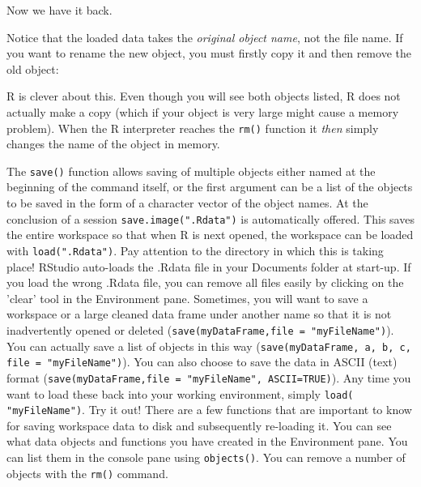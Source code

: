 \documentclass[titlepage]{book}\usepackage{knitr}
\begin{document}
\begin{knitrout}
\color{fgcolor}\begin{kframe}
\begin{alltt}
\hlstd{(}\hlstd{)}
\hlstd{()}
\end{alltt}
\end{kframe}
\end{knitrout}
Now we have it back.

Notice that the loaded data takes the \emph{original object name}, not the file name. If you want to rename the new object, you must firstly copy it and then remove the old object:

\begin{knitrout}
\color{fgcolor}\begin{kframe}
\begin{alltt}
 \hlkwb{<-} 
\hlstd{()}
\hlstd{()}
\end{alltt}
\end{kframe}
\end{knitrout}
R is clever about this.  Even though you will see both objects listed, R does not actually make a copy (which if your object is very large might cause a memory problem). When the R interpreter reaches the \texttt{rm()} function it \emph{then} simply changes the name of the object in memory.

The \texttt{save()} function allows saving of multiple objects either named at the beginning of the command itself, or the first argument can be a list of the objects to be saved in the form of a character vector of the object names.
 At the conclusion of a session \texttt{save.image(".Rdata")} is automatically offered.  This saves the entire workspace so that when R is next opened, the workspace can be loaded with \texttt{load(".Rdata")}. Pay attention to the directory in which this is taking place! RStudio auto-loads the .Rdata file in your Documents folder at start-up. If you load the wrong .Rdata file, you can remove all files easily by clicking on the 'clear' tool in the Environment pane.
Sometimes, you will want to save a workspace or a large cleaned data frame under another name so that it is not inadvertently opened or deleted (\texttt{save(myDataFrame,file =  "myFileName")}). You can actually save a list of objects in this way (\texttt{save(myDataFrame, a, b, c, file = "myFileName")}).  You can also choose to save the data in ASCII (text) format (\texttt{save(myDataFrame,file = "myFileName", ASCII=TRUE)}). Any time you want to load these back into your working environment, simply \texttt{load( "myFileName")}.  Try it out!
There are a few functions that are important to know for saving workspace data to disk and subsequently re-loading it. You can see what data objects and functions you have created in the Environment pane. You can list them in the console pane using \texttt{objects()}.  You can remove a number of objects with the \texttt{rm()} command.
\end{document}
